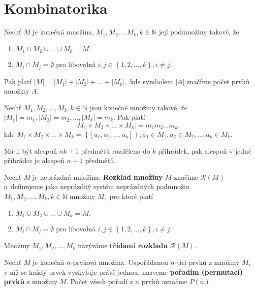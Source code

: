 \section{Kombinatorika}
\begin{veta}
    Nechť $M$ je konečná množina, $M_1, M_2, \dots M_k, k
    \in \mathbb N$ její podmnožiny takové, že
    \begin{enumerate}[$i.$]
    \item $M_1\cup M_2 \cup \dots \cup M_k = M,$
   	\item $M_i \cap M_j = \emptyset$ pro libovolná
    $i,j \in \left \{ 1,2,\dots,k \right \},i\ne j $.
    \end{enumerate}
    Pak platí $|M|=|M_1|+|M_2|+\dots +|M_k|,$ kde
    symbolem $|A|$ značíme počet prvků množiny $A$.
\end{veta}

\begin{veta}
    Nechť $M_1, M_2, \dots, M_k, k\in \mathbb N$ jsou konečné množiny takové,
    že $|M_1| = m_1, |M_2|=m_2, \dots, |M_k| = m_k.$ Pak platí
    $$|M_1\times M_2 \times \dots \times M_k| = m_1m_2\dots m_k,$$
    kde  $M_1\times M_2\times \dots \times M_k= \left \{ \left [ a_1, a_2, \dots, a_k \right ]  \right \}
    , a_1\in M_1, a_2 \in M_2, \dots, a_k \in M_k.$
\end{veta}

\begin{veta}
    Má-li být alespoň $nk+1$ předmětů rozděleno do $k$ přihrádek, pak
    alespoň v jedné přihrádce je alespoň $n+1$ předmětů.
\end{veta}

\begin{definition}
    Nechť $M$ je neprázdná množina. \textbf{Rozklad množiny} $M$ značíme
    $\mathscr R(M)$ a~definujeme jako neprázdný systém neprázdných podmnožin
    $M_1, M_2, \dots, M_k, k\in \mathbb N$ množiny $M,$ pro které platí
    \begin{enumerate}[$i.$]
    \item $M_1\cup M_2 \cup \dots \cup M_k = M,$
   	\item $M_i \cap M_j = \emptyset$ pro libovolná
    $i,j \in \left \{ 1,2,\dots,k \right \},i\ne j $.
    \end{enumerate}
    Množiny $M_1, M_2, \dots, M_k$ nazýváme \textbf{třídami rozkladu} $\mathscr R(M).$
\end{definition}

\begin{definition}
    Nechť $M$ je konečná $n$-prvková množina. Uspořádanou $n$-tici prvků z
    množiny $M$, v níž se každý prvek vyskytuje právě jednou, nazveme \textbf{pořadím
    (permutací) prvků} z množiny $M$. Počet všech pořadí z $n$ prvků označme $P(n).$
\end{definition}

